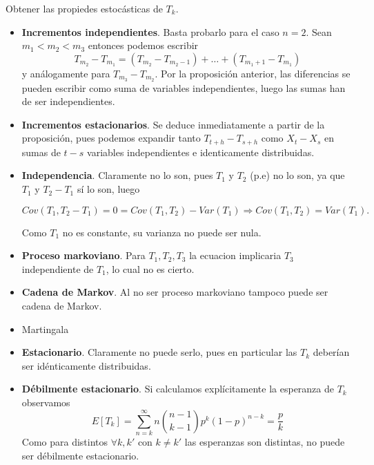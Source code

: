 \documentclass[PREyA.tex]{subfiles}
\begin{document}
\begin{example}
Obtener las propiedes estocásticas de $T_k$. 
\begin{itemize}
\item \textbf{Incrementos independientes}. Basta probarlo para el caso $n=2$. Sean $m_1 < m_2 < m_3$ entonces podemos escribir
$$
T_{m_2}- T_{m_1}  = (T_{m_2}- T_{m_2-1}) + … + (T_{m_{1}+1}- T_{m_1})
$$
y análogamente para $T_{m_3}- T_{m_2}$. Por la proposición anterior, las diferencias se pueden escribir como suma de variables independientes, luego las sumas han de ser independientes.

\item \textbf{Incrementos estacionarios}. Se deduce inmediatamente a partir de la proposición, pues podemos expandir tanto $T_{t+h}-T_{s+h}$ como $X_t - X_s$ en sumas de $t-s$ variables independientes e identicamente distribuidas.

\item \textbf{Independencia}. Claramente no lo son, pues $T_1$ y $T_2$ (p.e) no lo son, ya que $T_1$ y $T_2-T_1$ sí lo son, luego 

$$
Cov(T_1,T_2-T_1) = 0 = Cov(T_1,T_2) - Var(T_1) \Rightarrow Cov(T_1,T_2) = Var(T_1). 
$$

Como $T_1$ no es constante, su varianza no puede ser nula.
\item \textbf{Proceso markoviano}. Para $T_1,T_2,T_3$ la ecuacion implicaria $T_3$ independiente de $T_1$, lo cual no es cierto.

\item \textbf{Cadena de Markov}. Al no ser proceso markoviano tampoco puede ser cadena de Markov.
\item Martingala
\item \textbf{Estacionario}. Claramente no puede serlo, pues en particular las $T_k$ deberían ser idénticamente distribuidas.
\item \textbf{Débilmente estacionario}. Si calculamos explícitamente la esperanza de $T_k$ observamos
$$
E[T_k] = \sum_{n=k}^\infty n \binom{n-1}{k-1}p^k(1-p)^{n-k} = \frac{p}{k}
$$
Como para distintos $\forall k,k'$ con $k\neq k'$ las esperanzas son distintas, no puede ser débilmente estacionario.
\end{itemize}
\end{example}
\end{document}
